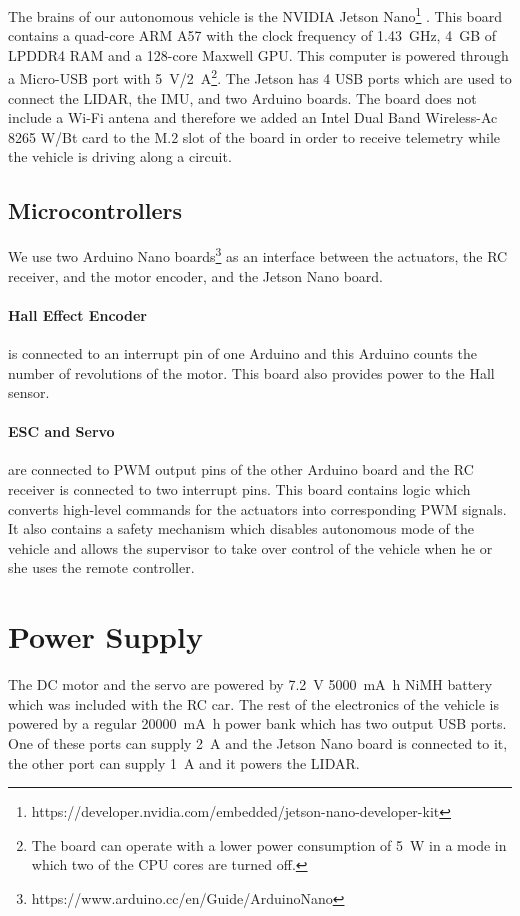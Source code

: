 The brains of our autonomous vehicle is the NVIDIA Jetson Nano\footnote{https://developer.nvidia.com/embedded/jetson-nano-developer-kit} . This board contains a quad-core ARM A57 with the clock frequency of \SI{1.43}{\giga\hertz}, \SI{4}{\giga B} of LPDDR4 RAM and a 128-core Maxwell GPU. This computer is powered through a Micro-USB port with \SI{5}{\volt}/\SI{2}{\ampere}\footnote{The board can operate with a lower power consumption of \SI{5}{\watt} in a mode in which two of the CPU cores are turned off.}. The Jetson has 4 USB ports which are used to connect the LIDAR, the IMU, and two Arduino boards. The board does not include a Wi-Fi antena and therefore we added an Intel Dual Band Wireless-Ac 8265 W/Bt card to the M.2 slot of the board in order to receive telemetry while the vehicle is driving along a circuit.

\subsection{Microcontrollers}

We use two Arduino Nano boards\footnote{https://www.arduino.cc/en/Guide/ArduinoNano} as an interface between the actuators, the RC receiver, and the motor encoder, and the Jetson Nano board.

\paragraph{Hall Effect Encoder} is connected to an interrupt pin of one Arduino and this Arduino counts the number of revolutions of the motor. This board also provides power to the Hall sensor.

\paragraph{ESC and Servo} are connected to PWM output pins of the other Arduino board and the RC receiver is connected to two interrupt pins. This board contains logic which converts high-level commands for the actuators into corresponding PWM signals. It also contains a safety mechanism which disables autonomous mode of the vehicle and allows the supervisor to take over control of the vehicle when he or she uses the remote controller.

\section{Power Supply}

The DC motor and the servo are powered by \SI{7.2}{\volt} \SI{5000}{\milli\ampere\hour} NiMH battery which was included with the RC car. The rest of the electronics of the vehicle is powered by a regular \SI{20000}{\milli\ampere\hour} power bank which has two output USB ports. One of these ports can supply \SI{2}{\ampere} and the Jetson Nano board is connected to it, the other port can supply \SI{1}{\ampere} and it powers the LIDAR.

